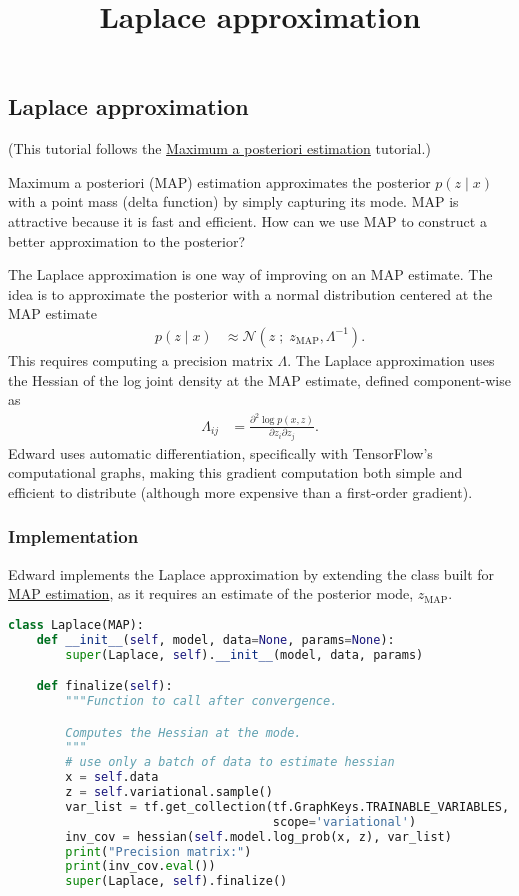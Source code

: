 \title{Laplace approximation}

\subsection{Laplace approximation}

(This tutorial follows the
\href{tut_MAP.html}{Maximum a posteriori estimation} tutorial.)

Maximum a posteriori (MAP) estimation approximates the posterior $p(z \mid x)$
with a point mass (delta function) by simply capturing its mode. MAP is
attractive because it is fast and efficient. How can we use MAP to construct a
better approximation to the posterior?

The Laplace approximation is one way of improving on an MAP estimate. The idea
is to approximate the posterior with a normal distribution centered at the MAP
estimate
\begin{align*}
  p(z \mid x)
  &\approx
  \mathcal{N}(z\;;\; z_\text{MAP}, \Lambda^{-1}).
\end{align*}
This requires computing a precision matrix $\Lambda$. The Laplace approximation
uses the Hessian of the log joint density at the MAP estimate,
defined component-wise as
\begin{align*}
  \Lambda_{ij}
  &=
  \frac{\partial^2 \log p(x, z)}{\partial z_i \partial z_j}.
\end{align*}
Edward uses automatic differentiation, specifically with TensorFlow's
computational graphs, making this gradient computation both simple and
efficient to distribute (although more expensive than a first-order
gradient).

\subsubsection{Implementation}

Edward implements the Laplace approximation by extending the class built for
\href{tut_MAP.html}{MAP estimation}, as it requires an estimate of the
posterior mode, $z_\text{MAP}$.

\begin{lstlisting}[language=Python]
class Laplace(MAP):
    def __init__(self, model, data=None, params=None):
        super(Laplace, self).__init__(model, data, params)

    def finalize(self):
        """Function to call after convergence.

        Computes the Hessian at the mode.
        """
        # use only a batch of data to estimate hessian
        x = self.data
        z = self.variational.sample()
        var_list = tf.get_collection(tf.GraphKeys.TRAINABLE_VARIABLES,
                                     scope='variational')
        inv_cov = hessian(self.model.log_prob(x, z), var_list)
        print("Precision matrix:")
        print(inv_cov.eval())
        super(Laplace, self).finalize()
\end{lstlisting}

